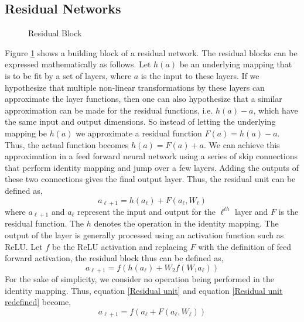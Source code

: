 \documentclass[oneside,a4paper,12pt]{report}
\begin{document}
\subsection{Residual Networks}
\begin{figure}
    \centering
    
    \caption{Residual Block}
    \label{fig: residual block}
\end{figure}
\hspace*{0.25 in}Figure \ref{fig: residual block} shows a building block of a residual network. The residual blocks can be expressed mathematically as follows. Let $h(a)$ be an underlying mapping that is to be fit by a set of layers, where $a$ is the input to these layers. If we hypothesize that multiple non-linear transformations by these layers can approximate the layer functions, then one can also hypothesize that a similar approximation can be made for the residual functions, i.e. $h(a) - a$, which have the same input and output dimensions. So instead of letting the underlying mapping be $h(a)$ we approximate a residual function $F(a) = h(a) - a$. Thus, the actual function becomes $h(a) = F(a) + a$. We can achieve this approximation in a feed forward neural network using a series of skip connections that perform identity mapping and jump over a few layers. Adding the outputs of these two connections gives the final output layer. Thus, the residual unit can be defined as,
\begin{equation}
    a_{\ell+1} = h(a_\ell) + F(a_\ell, W_\ell)
    \label{Residual unit}
\end{equation}
where $a_{\ell+1}$ and $a_\ell$ represent the input and output for the $\ell^{th}$ layer and $F$ is the residual function. The $h$ denotes the operation in the identity mapping. The output of the layer is generally processed using an activation function such as ReLU. Let $f$ be the ReLU activation and replacing $F$ with the definition of feed forward activation, the residual block thus can be defined as,
\begin{equation}
    a_{\ell+1} = f(h(a_\ell) + W_2f(W_1a_\ell))
    \label{Residual unit redefined}
\end{equation}
\hspace*{0.25 in}For the sake of simplicity, we consider no operation being performed in the identity mapping. Thus, equation \ref{Residual unit} and equation \ref{Residual unit redefined} become,
\begin{equation}
    a_{\ell+1} = f(a_\ell + F(a_\ell, W_\ell))
    \label{Final Residual notation}
\end{equation}
\end{document}
